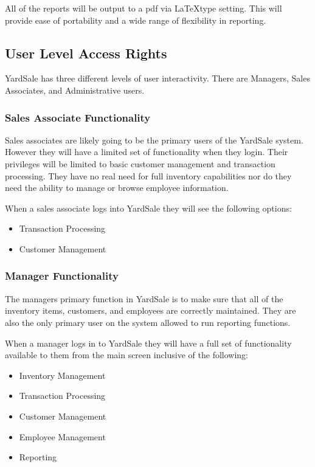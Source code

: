 \documentclass{report}
\begin{document}
    All of the reports will be output to a pdf via \LaTeX type
    setting. This will provide ease of portability and a wide range of
    flexibility in reporting.

    \subsection{User Level Access Rights}
    YardSale has three different levels of user interactivity. There
    are Managers, Sales Associates, and Administrative users.

    \subsubsection{Sales Associate Functionality}
    Sales associates are likely going to be the primary users of the
    YardSale system. However they will have a limited set of
    functionality when they login. Their privileges will be limited to
    basic customer management and transaction processing. They have no
    real need for full inventory capabilities nor do they need the
    ability to manage or browse employee information.

    When a sales associate logs into YardSale they will see the following options:

    \begin{itemize}
        \item Transaction Processing
        \item Customer Management
    \end{itemize}

    \subsubsection{Manager Functionality}
    The managers primary function in YardSale is to make sure that all
    of the inventory items, customers, and employees are correctly
    maintained. They are also the only primary user on the system
    allowed to run reporting functions.

    When a manager logs in to YardSale they will have a full set of
    functionality available to them from the main screen inclusive of
    the following:

    \begin{itemize}
        \item Inventory Management
        \item Transaction Processing
        \item Customer Management
        \item Employee Management
        \item Reporting
    \end{itemize}
\end{document}
